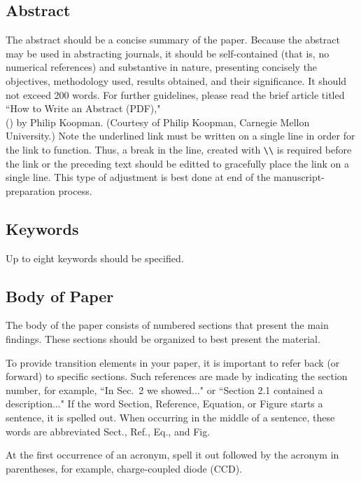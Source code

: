 \subsection{Abstract} 
The abstract should be a concise summary of the paper. Because the abstract may be used in abstracting journals, it should be self-contained (that is, no numerical references) and substantive in nature, presenting concisely the objectives, methodology used, results obtained, and their significance. It should not exceed 200 words. For further guidelines, please read the brief article titled ``How to Write an Abstract (PDF)," \\() by Philip Koopman. (Courtesy of Philip Koopman, Carnegie Mellon University.) Note the underlined link must be written on a single line in order for the link to function. Thus, a break in the line, created with {\verb+\\+} is required before the link or the preceding text should be editted to gracefully place the link on a single line. This type of adjustment is best done at end of the manuscript-preparation process.

\subsection{Keywords} 
Up to eight keywords should be specified. 

\subsection{Body of Paper} 
The body of the paper consists of numbered sections that present the main findings. These sections should be organized to best present the material.

To provide transition elements in your paper, it is important to refer back (or forward) to specific sections. Such references are made by indicating the section number, for example, ``In Sec.\ 2 we showed..." or ``Section 2.1 contained a description..." If the word Section, Reference, Equation, or Figure starts a sentence, it is spelled out. When occurring in the middle of a sentence, these words are abbreviated Sect., Ref., Eq., and Fig. 

At the first occurrence of an acronym, spell it out followed by the acronym in parentheses, for example, charge-coupled diode (CCD).

